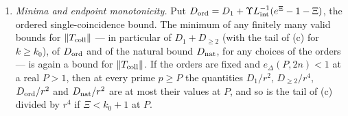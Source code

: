 \begin{lemma}
\begin{enumerate}[label=\textup{(\alph*)}]
\begin{equation}
 \end{equation}
 the \emph{natural bound}.
\item \emph{Minima and endpoint monotonicity.} Put
 $D_{\rm ord}=D_1+\Upsilon L_{\rm int}^{-1}(e^\Xi-1-\Xi)$, the ordered
 single-coincidence bound. The minimum of any finitely many valid bounds for
 $\left\|T_{\rm coll}\right\|$ --- in particular of $D_1+D_{\ge2}$ (with the tail of
 \textup{(c)} for $k\ge k_0$), of $D_{\rm ord}$ and of the natural bound
 $D_{\rm nat}$, for any choices of the orders --- is again a bound for
 $\left\|T_{\rm coll}\right\|$. If the orders are fixed and $e_\Delta(P,2n)<1$ at a real
 $P>1$, then at every prime $p\ge P$ the quantities $D_1/r^2$, $D_{\ge2}/r^4$,
 $D_{\rm ord}/r^2$ and $D_{\rm nat}/r^2$ are at most their values at $P$, and so is
 the tail of \textup{(c)} divided by $r^4$ if $\Xi<k_0+1$ at $P$.
\end{enumerate}
\end{lemma}

